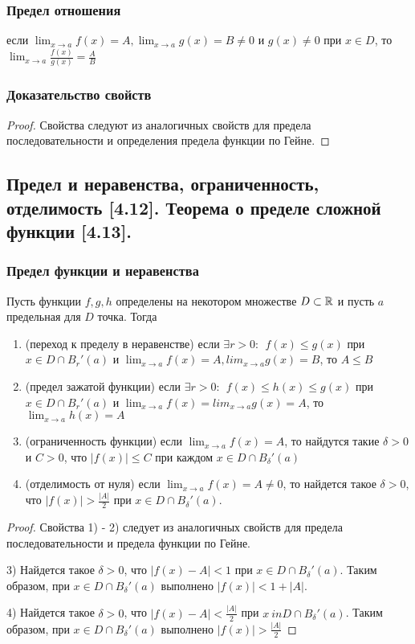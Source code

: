 \documentclass[12pt, a4paper]{article}
\begin{document}
    \subsubsection{Предел отношения}
     если $\lim_{x \to a} f(x) = A, \lim_{x \to a} g(x) = B \ne 0$ и $g(x) \ne 0$ при $x \in D$, то $\lim_{x \to a} \frac{f(x)}{g(x)} = \frac{A}{B}$
    \subsubsection{Доказательство свойств}
    \begin{proof}
    Свойства  следуют из аналогичных свойств для предела последовательности и определения предела функции по Гейне.
    \end{proof}
    \subsection{Предел и неравенства, ограниченность, отделимость [4.12]. Теорема о пределе сложной функции [4.13].}
    \subsubsection{Предел функции и неравенства}
    Пусть функции $f, g, h$ определены на некотором множестве $D \subset \mathbb{R}$ и пусть $a$ предельная для $D$ точка. Тогда
    \begin{enumerate}
        \item (переход к пределу в неравенстве) если $\exists r > 0: \ \ f(x) \leq g(x)$ при $x \in D \cap B_{r}'(a)$ и $\lim_{x \to a} f(x) = A, lim_{x \to a} g(x) = B$, то $A \leq B$
        \item (предел зажатой функции) если $\exists r > 0: \ \ f(x) \leq h(x) \leq g(x)$ при $x \in D \cap B_{r}'(a)$ и  $\lim_{x \to a} f(x) = lim_{x \to a} g(x) = A$, то $\lim_{x \to a} h(x) = A$
        \item (ограниченность функции) если $\lim_{x \to a} f(x) = A$, то найдутся такие $\delta > 0$ и $C > 0$, что $|f(x)| \leq C$ при каждом $x \in D \cap B_{\delta}'(a)$
        \item (отделимость от нуля) если $\lim_{x \to a} f(x) = A \ne 0$, то найдется такое $\delta > 0$, что $|f(x)| > \frac{|A|}{2}$ при $x \in D \cap B_{\delta}'(a)$.
    \end{enumerate}
    \begin{proof}
    Свойства 1) - 2) следует из аналогичных свойств для предела последовательности и предела функции по Гейне.

    3) Найдется такое $\delta > 0$, что $|f(x) - A| < 1$ при $x \in D \cap B_{\delta}'(a)$. Таким образом, при $x \in D \cap B_{\delta}'(a)$ выполнено $|f(x)| < 1 + |A|$.

    4) Найдется такое $\delta > 0$, что $|f(x) - A| < \frac{|A|}{2}$ при $x \ in D \cap B_{\delta}'(a)$. Таким образом, при $x \in D \cap B_{\delta}'(a)$ выполнено $|f(x)| > \frac{|A|}{2}$
    \end{proof}
\end{document}
